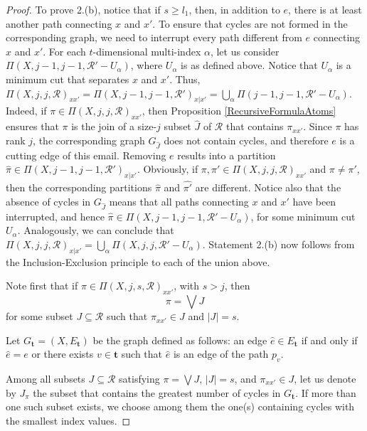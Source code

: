 \documentclass[10pt,a4paper]{amsart}
\begin{document}
\begin{proof}
		To prove 2.(b), notice that if $s\geq l_1$, then, in addition to $e$,  there is at least another path connecting $x$ and $x'$. To ensure that cycles are not formed in the corresponding graph, we need to interrupt every path different from $e$ connecting $x$ and $x'$. For each  $t$-dimensional multi-index $\alpha$, let us consider $\Pi(X,j-1,j-1,\mathcal{R}'-U_{\alpha})$, where $U_{\alpha}$ is as defined above. Notice that $U_{\alpha}$ is a minimum cut that separates $x$ and $x'$. Thus, $\Pi(X,j,j,\mathcal{R})_{xx'}=\Pi(X,j-1,j-1,\mathcal{R}')_{x|x'}=\bigcup_{\alpha}\Pi(j-1,j-1,\mathcal{R}'-U_{\alpha})$. Indeed, if $\pi\in \Pi(X,j,j,\mathcal{R})_{xx'}$, then Proposition \ref{RecursiveFormulaAtoms} ensures that $\pi$ is the join of a size-$j$ subset $\hat{J}$ of $\mathcal{R}$ that contains $\pi_{xx'}$. Since $\pi$ has rank $j$, the corresponding graph $G_{\hat{J}}$ does not contain cycles, and therefore $e$ is a cutting edge of this email. Removing $e$ results into a partition $\hat{\pi}\in \Pi(X,j-1,j-1,\mathcal{R}')_{x|x'}$. Obviously, if  $\pi,\pi'\in \Pi(X,j,j,\mathcal{R})_{xx'}$ and $\pi\neq\pi'$, then the corresponding partitions $\hat{\pi}$ and $\hat{\pi'}$ are different. Notice also that the absence of cycles in $G_{\hat{J}}$ means that all paths connecting $x$ and $x'$ have been interrupted, and hence $\hat{\pi}\in\Pi(X,j-1,j-1,\mathcal{R}'-U_{\alpha})$, for some minimum cut $U_{\alpha}$. Analogously, we can conclude that $\Pi(X,j,j,\mathcal{R})_{x|x'}=\bigcup_{\alpha}\Pi(X,j,j,\mathcal{R}'-U_{\alpha})$.
		Statement 2.(b) now follows from the Inclusion-Exclusion principle to each of the union above.
		
		Note first that if \( \pi \in \Pi(X, j, s, \mathcal{R})_{xx'} \), with \( s > j \), then
		\[
		\pi = \bigvee J
		\]
		for some subset \( J \subseteq \mathcal{R} \) such that \( \pi_{xx'} \in J \) and \( |J| = s \).
		
		Let \( G_{\mathbf{t}} = (X, E_{\mathbf{t}}) \) be the graph defined as follows: an edge \( \hat{e} \in E_{\mathbf{t}} \) if and only if \( \hat{e} = e \) or there exists \( v \in \mathbf{t} \) such that \( \hat{e} \) is an edge of the path \( p_v \).
		
		Among all subsets \( J \subseteq \mathcal{R} \) satisfying \( \pi = \bigvee J \), \( |J| = s \), and \( \pi_{xx'} \in J \), let us denote by \( J_{\pi} \) the subset that contains the greatest number of cycles in \( G_{\mathbf{t}} \). If more than one such subset exists, we choose among them the one(s) containing cycles with the smallest index values.
		

\end{proof}
\end{document}
